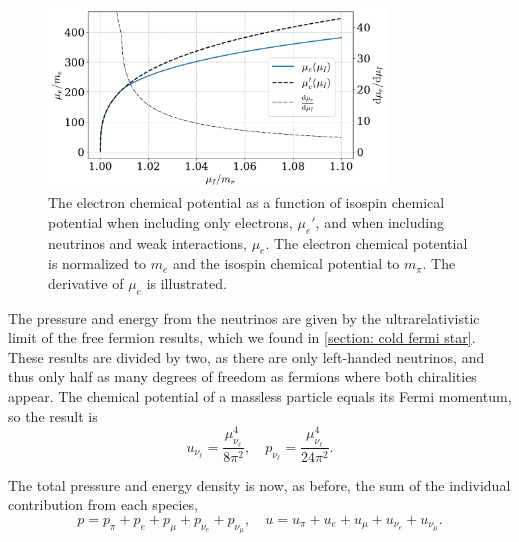 \begin{figure}[!htb]
    \centering
    \includegraphics[width=0.8\textwidth]{../scripts/figurer/neutrino_mu.pdf}
    \caption{
        The electron chemical potential as a function of isospin chemical potential when including only electrons, $\mu_e'$, and when including neutrinos and weak interactions, $\mu_e$.
        The electron chemical potential is normalized to $m_e$ and the isospin chemical potential to $m_\pi$.
        The derivative of $\mu_e$ is illustrated.
    }
    \label{fig: neutrino mu}
\end{figure}


The pressure and energy from the neutrinos are given by the ultrarelativistic limit of the free fermion results, which we found in \autoref{section: cold fermi star}.
These results are divided by two, as there are only left-handed neutrinos, and thus only half as many degrees of freedom as fermions where both chiralities appear.
The chemical potential of a massless particle equals its Fermi momentum, so the result is
%
\begin{equation}
    u_{\nu_\ell} = \frac{\mu_{\nu_\ell}^4}{8 \pi^2}, \quad 
    p_{\nu_\ell} = \frac{\mu_{\nu_\ell}^4}{24 \pi^2}.
\end{equation}
%

The total pressure and energy density is now, as before, the sum of the individual contribution from each species,
%
\begin{equation}
    p = p_\pi + p_e + p_\mu + p_{\nu_e} + p_{\nu_\mu}, \quad
    u = u_\pi + u_e + u_\mu + u_{\nu_e} + u_{\nu_\mu}.
\end{equation}
%

